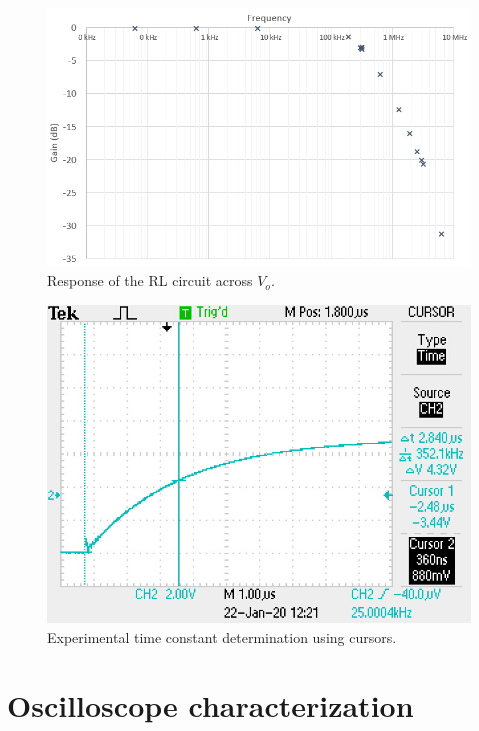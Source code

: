 \documentclass{report}
\begin{document}
\begin{minipage}{0.55\linewidth}
	\begin{figure}[H]
		\centering
		\includegraphics[width=\linewidth]{rlresponse}
		\caption{Response of the RL circuit across $V_o$.}
		\label{fig:rlresponse}
	\end{figure}
\end{minipage}
\begin{minipage}{0.45\linewidth}
\begin{figure}[H]
	\centering
	\includegraphics[width=1.0\linewidth]{ALL0011/F0011TEK}
	\caption{Experimental time constant determination using cursors.}
	\label{fig:rltek}
\end{figure}
\end{minipage}
\pagebreak

\section{Oscilloscope characterization}
\end{document}
